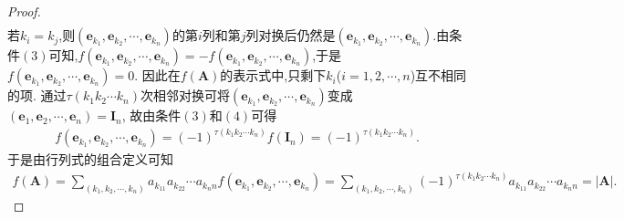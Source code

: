 \documentclass[../../main.tex]{subfiles}
\begin{document}
\begin{proof}
\begin{align*}
\end{align*}
若\(k_i = k_j\),则\((\boldsymbol{e}_{k_1},\boldsymbol{e}_{k_2},\cdots,\boldsymbol{e}_{k_n})\)的第\(i\)列和第\(j\)列对换后仍然是\((\boldsymbol{e}_{k_1},\boldsymbol{e}_{k_2},\cdots,\boldsymbol{e}_{k_n})\).由条件\((3)\)可知,\(f(\boldsymbol{e}_{k_1},\boldsymbol{e}_{k_2},\cdots,\boldsymbol{e}_{k_n}) = -f(\boldsymbol{e}_{k_1},\boldsymbol{e}_{k_2},\cdots,\boldsymbol{e}_{k_n})\),于是\(f(\boldsymbol{e}_{k_1},\boldsymbol{e}_{k_2},\cdots,\boldsymbol{e}_{k_n}) = 0\).
因此在\(f(\boldsymbol{A})\)的表示式中,只剩下\(k_i\)(\(i = 1,2,\cdots,n\))互不相同的项.
通过\(\tau(k_1k_2\cdots k_n)\)次相邻对换可将\((\boldsymbol{e}_{k_1},\boldsymbol{e}_{k_2},\cdots,\boldsymbol{e}_{k_n})\)变成\((\boldsymbol{e}_1,\boldsymbol{e}_2,\cdots,\boldsymbol{e}_n) = \boldsymbol{I}_n\),
故由条件\((3)\)和\((4)\)可得
\begin{align*}
f(\boldsymbol{e}_{k_1},\boldsymbol{e}_{k_2},\cdots,\boldsymbol{e}_{k_n}) = (-1)^{\tau(k_1k_2\cdots k_n)}f(\boldsymbol{I}_n) = (-1)^{\tau(k_1k_2\cdots k_n)}.
\end{align*}
于是由行列式的组合定义可知
\begin{align*}
f(\boldsymbol{A}) = \sum_{(k_1,k_2,\cdots,k_n)}a_{k_11}a_{k_22}\cdots a_{k_nn}f(\boldsymbol{e}_{k_1},\boldsymbol{e}_{k_2},\cdots,\boldsymbol{e}_{k_n}) = \sum_{(k_1,k_2,\cdots,k_n)}(-1)^{\tau(k_1k_2\cdots k_n)}a_{k_11}a_{k_22}\cdots a_{k_nn} = |\boldsymbol{A}|.
\end{align*}
\end{proof}
\end{document}
